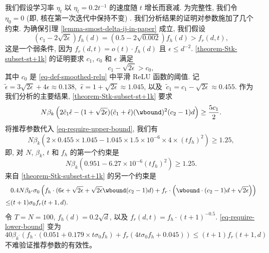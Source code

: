 我们假设学习率 $\eta_t $ 以 $\eta_t = 0.2 t^{-1}$ 的速度随 $t$ 增长而衰减. 
为完整性, 我们令 $\eta_0 = 0$ (即, 核在第一次迭代中保持不变) . 
我们分析结果的证明对参数施加了几个约束. 
为确保引理 \ref{lemma-smost-delta-ij-in-paper} 成立, 我们假设
\begin{equation}
    (c_1 - 2\sqrt{2\epsilon}) f_h(d) = (0.5 - 2\sqrt{0.002}) f_h(d) > f_r(d,t),
\end{equation}
这是一个弱条件, 因为 $f_r(d,t) =  o(t) \cdot f_h(d)$ 且 $\epsilon \leq d^{-2}$. 
\ref{theorem-Stk-subset-st+1k} 的证明要求 $c_1$, $c_0$ 和 $\epsilon$ 满足
\begin{equation}
    c_1 - \sqrt{2\epsilon} > c_0,
\end{equation}
其中 $c_0$ 是 \ref{eq-def-smoothed-relu} 中平滑 ReLU 函数的阈值. 
记 $\tilde{\epsilon} = 3\sqrt{2\epsilon} + 4\epsilon 
\approx 0.138$, $\ \hat{\epsilon} = 1 + \sqrt{2\epsilon} \approx 1.045$, 以及 $\ \tilde{c}_1 = c_1 - \sqrt{2\epsilon} \approx 0.455$.  
作为我们分析的主要结果, \ref{theorem-Stk-subset-st+1k} 要求
\begin{equation}\label{eq-require-upper-bound}
N \beta_k \left( 
        2\tilde{c}_1\hat{\epsilon} - (1+\sqrt{2\epsilon})(\tilde{c}_1 + \hat{\epsilon})(\wbound)^2 (c_2 - 1) d
        \right) \geq \frac{5c_1}{2}.
\end{equation}
将推荐参数代入 \ref{eq-require-upper-bound}, 我们有
\begin{equation}
    N \beta_k \left( 
        2 \times 0.455 \times 1.045 - 1.045 \times 1.5 \times 10^{-6} \times 4 \times (t f_h)^2
        \right) \geq 1.25,
\end{equation}
即, 对 $N$, $\beta_k$, $t$ 和 $f_h$ 的第一个约束是
\begin{equation}
    N \beta_k \left( 0.951 - 6.27 \times 10^{-6} (tf_h)^2 \right) \geq 1.25.
\end{equation}
来自 \ref{theorem-Stk-subset-st+1k} 的另一个约束是
\begin{equation}\label{eq-require-lower-bound}
\begin{aligned}
    &0.4 N \beta_{k^{\prime}} \sigma_0 \left(
    f_h \cdot (6\epsilon + \sqrt{2\epsilon} + \sqrt{2\epsilon} \wbound (c_2 - 1)d ) + f_r \cdot \left(\wbound \cdot (c_2 - 1) d + \sqrt{2\epsilon}\right)
    \right) \\
    \leq &(t+1) \sigma_0 f_r(t+1, d).
\end{aligned}
\end{equation}
令 $T = N = 100$, $f_h(d) = 0.2\sqrt{d}$, 以及 $f_r(d, t) = f_h \cdot (t+1)^{-0.5}$. 
\ref{eq-require-lower-bound} 变为
\begin{equation}
    40 \beta_{k^{\prime}} \left( f_h \cdot (0.051 + 0.179 \times t \sigma_0 f_h) + f_r (4t \sigma_0 f_h + 0.045) \right) \leq (t+1) f_r(t+1, d)
\end{equation}
不难验证推荐参数的有效性。 

